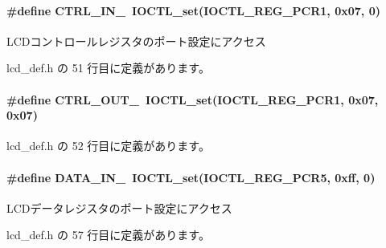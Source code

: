 \paragraph[{C\+T\+R\+L\+\_\+\+I\+N\+\_\+}]{\setlength{\rightskip}{0pt plus 5cm}\#define C\+T\+R\+L\+\_\+\+I\+N\+\_\+~I\+O\+C\+T\+L\+\_\+set(I\+O\+C\+T\+L\+\_\+\+R\+E\+G\+\_\+\+P\+C\+R1, 0x07, 0)}\label{lcd__def_8h_a5acf862063659f53ff393baf0a3c084c_a5acf862063659f53ff393baf0a3c084c}


L\+C\+Dコントロールレジスタのポート設定にアクセス 



 lcd\+\_\+def.\+h の 51 行目に定義があります。

\paragraph[{C\+T\+R\+L\+\_\+\+O\+U\+T\+\_\+}]{\setlength{\rightskip}{0pt plus 5cm}\#define C\+T\+R\+L\+\_\+\+O\+U\+T\+\_\+~I\+O\+C\+T\+L\+\_\+set(I\+O\+C\+T\+L\+\_\+\+R\+E\+G\+\_\+\+P\+C\+R1, 0x07, 0x07)}\label{lcd__def_8h_a700244d375fe1b64b6403beed6f3d07e_a700244d375fe1b64b6403beed6f3d07e}


 lcd\+\_\+def.\+h の 52 行目に定義があります。

\paragraph[{D\+A\+T\+A\+\_\+\+I\+N\+\_\+}]{\setlength{\rightskip}{0pt plus 5cm}\#define D\+A\+T\+A\+\_\+\+I\+N\+\_\+~I\+O\+C\+T\+L\+\_\+set(I\+O\+C\+T\+L\+\_\+\+R\+E\+G\+\_\+\+P\+C\+R5, 0xff, 0)}\label{lcd__def_8h_a93040b09391e6633c7229744479c0648_a93040b09391e6633c7229744479c0648}


L\+C\+Dデータレジスタのポート設定にアクセス 



 lcd\+\_\+def.\+h の 57 行目に定義があります。

